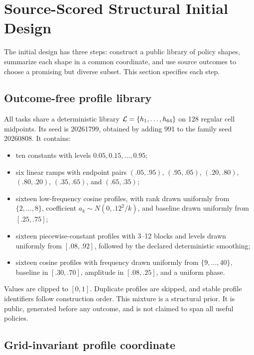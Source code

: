 \section{Source-Scored Structural Initial Design}\label{sec:method}

The initial design has three steps: construct a public library of policy
shapes, summarize each shape in a common coordinate, and use source outcomes
to choose a promising but diverse subset.  This section specifies each step.

\subsection{Outcome-free profile library}

All tasks share a deterministic library $\mathcal{L}=\{h_1,\ldots,h_{64}\}$ on 128
regular cell midpoints.  Its seed is 20261799, obtained by adding 991 to the
family seed 20260808.  It contains:
\begin{itemize}
\item ten constants with levels $0.05,0.15,\ldots,0.95$;
\item six linear ramps with endpoint pairs $(.05,.95)$, $(.95,.05)$,
$(.20,.80)$, $(.80,.20)$, $(.35,.65)$, and $(.65,.35)$;
\item sixteen low-frequency cosine profiles, with rank drawn uniformly from
$\{2,\ldots,8\}$, coefficient $a_k\sim N(0,.12^2/k)$, and baseline drawn
uniformly from $[.25,.75]$;
\item sixteen piecewise-constant profiles with 3--12 blocks and levels drawn
uniformly from $[.08,.92]$, followed by the declared deterministic smoothing;
\item sixteen cosine profiles with frequency drawn uniformly from
$\{9,\ldots,40\}$, baseline in $[.30,.70]$, amplitude in $[.08,.25]$, and a
uniform phase.
\end{itemize}
Values are clipped to $[0,1]$.  Duplicate profiles are skipped, and stable
profile identifiers follow construction order.  This mixture is a structural
prior.  It is public, generated before any outcome, and is not claimed to span
all useful policies.

\subsection{Grid-invariant profile coordinate}

